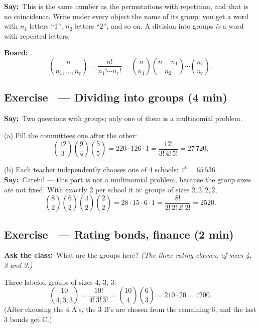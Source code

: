 \documentclass[11pt,a4paper,parskip=half]{scrartcl}
\newcommand{\say}{\textbf{\color{teal}Say:}\ }
\newcommand{\board}{\textbf{\color{gold}Board:}\ }
\newcommand{\ask}{\textbf{\color{navy}Ask the class:}\ }
\newcommand{\slide}[1]{\marginpar{\raggedright\footnotesize\color{gray}slide #1}}
\begin{document}
\say This is the same number as the permutations with repetition, and that
is no coincidence. Write under every object the name of its group: you get
a word with $n_1$ letters ``1'', $n_2$ letters ``2'', and so on. A division
into groups \emph{is} a word with repeated letters.

\board
\[ \binom{n}{n_1,\dots,n_r} = \frac{n!}{n_1!\cdots n_r!}
	= \binom{n}{n_1}\binom{n-n_1}{n_2}\cdots\binom{n_r}{n_r}. \]

\subsection{Exercise~ --- Dividing into groups (4 min)}\slide{11}


\say Two questions with groups; only one of them is a multinomial problem.

(a) Fill the committees one after the other:
\[ \binom{12}{3}\binom{9}{4}\binom55 = 220\cdot126\cdot1
	= \frac{12!}{3!\,4!\,5!} = 27\,720. \]

(b) Each teacher independently chooses one of 4 schools: $4^8 = 65\,536$.
\say Careful --- this part is not a multinomial problem, because the group
sizes are not fixed. With exactly 2 per school it is: groups of sizes
$2,2,2,2$,
\[ \binom82\binom62\binom42\binom22 = 28\cdot15\cdot6\cdot1
	= \frac{8!}{2!\,2!\,2!\,2!} = 2520. \]

\subsection{Exercise~ --- Rating bonds, finance (2 min)}\slide{12}


\ask What are the groups here? \emph{(The three rating classes, of sizes 4,
	3 and 3.)}

Three labeled groups of sizes 4, 3, 3:
\[ \binom{10}{4,3,3} = \frac{10!}{4!\,3!\,3!} = \binom{10}{4}\binom63
	= 210\cdot 20 = 4200. \]
(After choosing the 4 A's, the 3 B's are chosen from the remaining 6, and
the last 3 bonds get C.)
\end{document}
